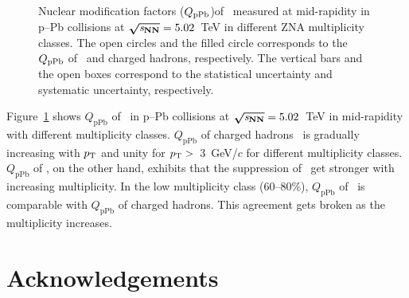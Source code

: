 \documentclass[ALICE,manyauthors]{cernphprep}
\begin{document}
\begin{figure}[!hbt]
	\centering
	\caption{ Nuclear modification factors ($Q_{\rm{pPb}}$)of \fzero~measured at mid-rapidity in p--Pb collisions at $\boldsymbol{\sqrt{{\textit s_\mathrm{NN}}}}=5.02$~TeV in different ZNA multiplicity classes. The open circles and the filled circle corresponds to the $Q_{\rm{pPb}}$ of \fzero~and charged hadrons, respectively. The vertical bars and the open boxes correspond to the statistical uncertainty and systematic uncertainty, respectively. }
	\label{fig:QpPb}
\end{figure}

Figure~\ref{fig:QpPb} shows $Q_{\mathrm{pPb}}$ of \fzero~in p--Pb collisions at $\boldsymbol{\sqrt{{\textit s_\mathrm{NN}}}}=5.02$~TeV in mid-rapidity with different multiplicity classes. $Q_{\mathrm{pPb}}$ of charged hadrons~\cite{ALICE:2014xsp} is gradually increasing with $p_{\rm{T}}$ and unity for $p_{\rm{T}}>$~3~GeV/$c$ for different multiplicity classes. $Q_{\mathrm{pPb}}$ of \fzero, on the other hand, exhibits that the suppression of \fzero~get stronger with increasing multiplicity. In the low multiplicity class (60--80\%), $Q_{\mathrm{pPb}}$ of \fzero~is comparable with $Q_{\mathrm{pPb}}$ of charged hadrons. This agreement gets broken as the multiplicity increases.

\newenvironment{acknowledgement}{\relax}{\relax}
\begin{acknowledgement}
\section*{Acknowledgements}
\noindent 
\end{acknowledgement}

\newpage
\appendix



\clearpage




%     
\end{document}
